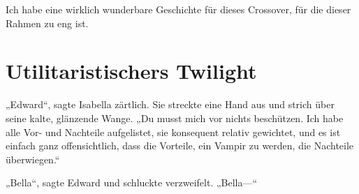 Ich habe eine wirklich wunderbare Geschichte für dieses Crossover, für die dieser Rahmen zu eng ist.

\section{Utilitaristischers Twilight\protect\footnotemark}

„Edward“, sagte Isabella zärtlich. Sie streckte eine Hand aus und strich über seine kalte, glänzende Wange.
„Du musst mich vor nichts beschützen. Ich habe alle Vor- und Nachteile aufgelistet, sie konsequent relativ gewichtet, und es ist einfach ganz offensichtlich, dass die Vorteile, ein Vampir zu werden, die Nachteile überwiegen.“

„Bella“, sagte Edward und schluckte verzweifelt.
„Bella—“

